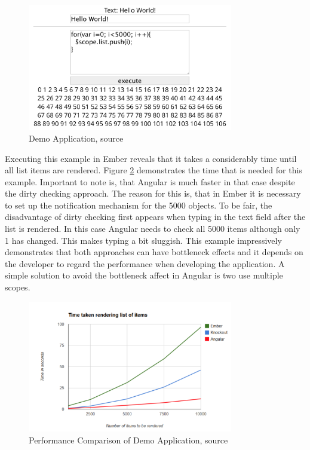 \begin{figure}
	\centering	
	\includegraphics[width=0.8\textwidth]{./img/tech-ana/performance_demo_app.png}
	\caption{Demo Application, source \autocite{binding_comparison}}
	\label{fig:demo_app}
\end{figure} 

Executing this example in Ember reveals that it takes a considerably time until all list items are rendered.
Figure \ref{fig:performance_demo_app} demonstrates the time that is needed for this example. 
Important to note is, that Angular is much faster in that case despite the dirty checking approach. 
The reason for this is, that in Ember it is necessary to set up the notification mechanism for the 5000 objects.
To be fair, the disadvantage of dirty checking first appears when typing in the text field after the list is rendered. 
In this case Angular needs to check all 5000 items although only 1 has changed. 
This makes typing a bit sluggish. 
This example impressively demonstrates that both approaches can have bottleneck effects and it depends on the developer to regard the performance when developing the application. 
A simple solution to avoid the bottleneck affect in Angular is two use multiple scopes.

\begin{figure}
	\centering	
	\includegraphics[width=0.8\textwidth]{./img/tech-ana/performance_comp.png}
	\caption{Performance Comparison of Demo Application, source \autocite{binding_comparison}}
	\label{fig:performance_demo_app}
\end{figure} 

